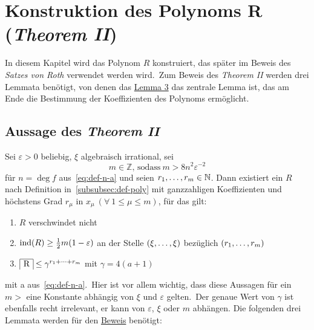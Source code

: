 
\section{Konstruktion des Polynoms R (\emph{Theorem II})}
    \label{sec:th2}
    \textrm{In diesem Kapitel wird das Polynom $R$ konstruiert, das später im Beweis des \emph{Satzes von Roth}
    verwendet werden wird.\ Zum Beweis des \emph{Theorem II} werden drei Lemmata benötigt, von denen das \hyperref
    [subsec:lemma3]{Lemma 3} das zentrale Lemma ist, das am Ende die Bestimmung der Koeffizienten des Polynoms
    ermöglicht.}
    
    \subsection{Aussage des \emph{Theorem II}}
        \label{subsec:th2}
        Sei $\varepsilon > 0$ beliebig, $\xi$ algebraisch irrational, sei
        \begin{equation}
            m \in \mathbb{Z} \text{, sodass} \  m > 8 n^2 \varepsilon^{-2} \label{eq:def-m}
        \end{equation}
        \textrm{für $n = \deg f$ aus~\eqref{eq:def-n-a} und seien $r_1, \dots, r_m \in \mathbb{N}$.
        Dann existiert ein $R$ nach Definition in~\ref{subsubsec:def-poly} mit ganzzahligen Koeffizienten und höchstens
        Grad $r_\mu$ in $x_\mu \ (\forall \ 1 \leq \mu \leq m)$, für das gilt:}
        \begin{enumerate}
            \item $R$ verschwindet nicht
            \item \textrm{$\operatorname{ind}(R) \geq \frac{1}{2} m (1 - \varepsilon)$ an der Stelle $(\xi, \dots, \xi)$ bezüglich
                $(r_1, \dots, r_m)$}
            \item $\content{R} \leq \gamma^{\dsum{r_1}{r_m}}$ mit $\gamma = 4 (a + 1)$
        \end{enumerate}
        \textrm{mit a aus~\eqref{eq:def-n-a}.\ Hier ist vor allem wichtig, dass diese Aussagen für ein $m >$ eine Konstante
        abhängig von $\xi$ und $\varepsilon$ gelten.\ Der genaue Wert von $\gamma$ ist ebenfalls recht irrelevant, er
        kann von $\varepsilon$, $\xi$ oder $m$ abhängen.}
        \newline \newline
        \textrm{Die folgenden drei Lemmata werden für den \hyperref[subsec:proof-th2]{Beweis} benötigt:}
    
    
    
